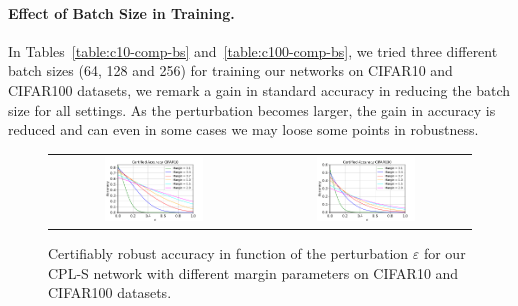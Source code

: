 \begin{table}[h]
\begin{tabular}
  \bottomrule
  \end{tabular}%
  \caption{Results on the CIFAR100 dataset on standard and  provably certifiable accuracies for different values of perturbations $\varepsilon$ on CPL (ours) models with various batch sizes. The average time per epoch in seconds is also reported in the last column. All the reported networks use Last Layer Normalization.}
  \label{table:c100-comp-bs}%
\end{table}%

\paragraph{Effect of Batch Size in Training.}
In Tables~\ref{table:c10-comp-bs} and~\ref{table:c100-comp-bs}, we tried three different batch sizes (64, 128 and 256) for training our networks on CIFAR10 and CIFAR100 datasets, we remark a gain in standard accuracy in reducing the batch size for all settings. As the perturbation becomes larger, the gain in accuracy is reduced and can even in some cases we may loose some points in robustness.


\begin{figure}[h]
    \centering
    \begin{tabular}{cc}
    \includegraphics[width=0.49\textwidth]{sections/4_certification/images/cert_acc_margin_eps_c10.pdf}&\includegraphics[width=0.49\textwidth]{sections/4_certification/images/cert_acc_margin_eps_c100.pdf}
    \end{tabular}
    \caption{Certifiably robust accuracy in function of the perturbation $\varepsilon$ for our CPL-S  network with different margin parameters on CIFAR10 and CIFAR100 datasets.}
    \label{fig:cert-acc-margin}
\end{figure}


